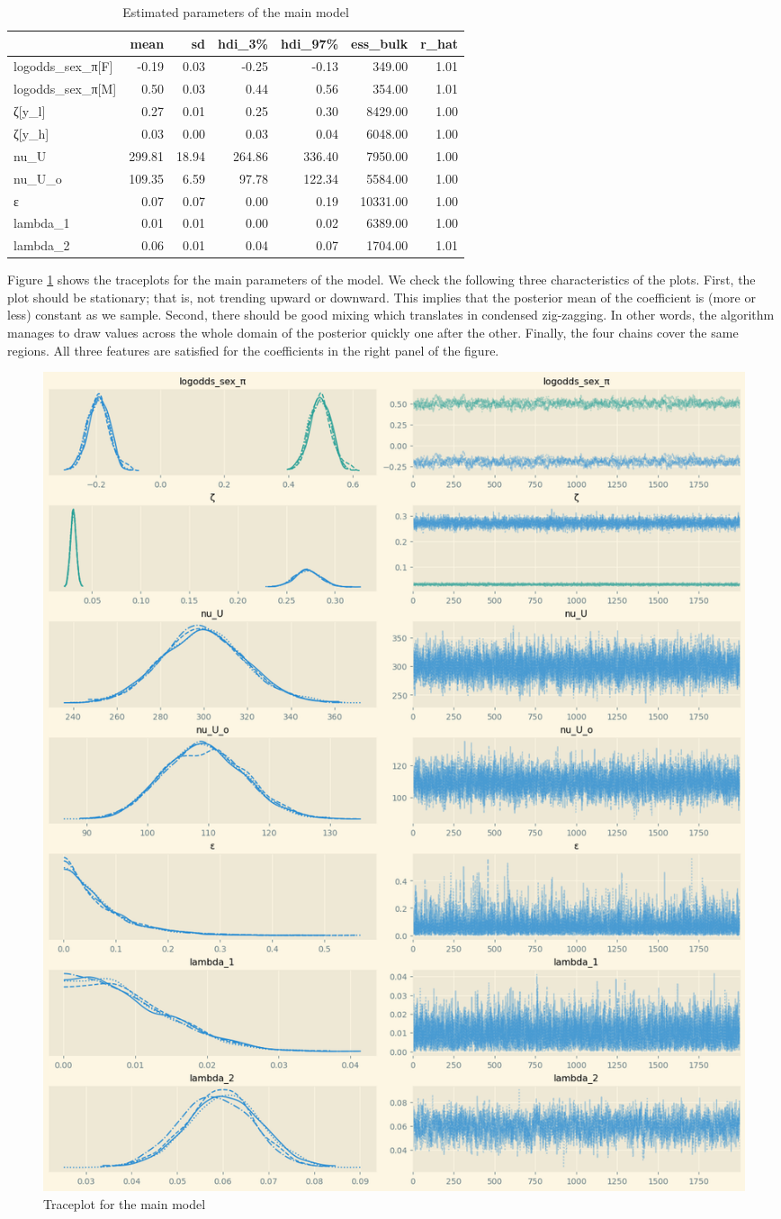 \documentclass[a4paper,12pt]{article}
\begin{document}
\begin{table}[htbp]
\caption{\label{tab:rhat_main}Estimated parameters of the main model}
\centering
\begin{tabular}{lrrrrrr}
 & mean & sd & hdi\_3\% & hdi\_97\% & ess\_bulk & r\_hat\\
\hline
logodds\_sex\_π{[}F] & -0.19 & 0.03 & -0.25 & -0.13 & 349.00 & 1.01\\
logodds\_sex\_π{[}M] & 0.50 & 0.03 & 0.44 & 0.56 & 354.00 & 1.01\\
ζ[y\_l] & 0.27 & 0.01 & 0.25 & 0.30 & 8429.00 & 1.00\\
ζ[y\_h] & 0.03 & 0.00 & 0.03 & 0.04 & 6048.00 & 1.00\\
nu\_U & 299.81 & 18.94 & 264.86 & 336.40 & 7950.00 & 1.00\\
nu\_U\_o & 109.35 & 6.59 & 97.78 & 122.34 & 5584.00 & 1.00\\
ε & 0.07 & 0.07 & 0.00 & 0.19 & 10331.00 & 1.00\\
lambda\_1 & 0.01 & 0.01 & 0.00 & 0.02 & 6389.00 & 1.00\\
lambda\_2 & 0.06 & 0.01 & 0.04 & 0.07 & 1704.00 & 1.01\\
\end{tabular}
\end{table}


Figure \ref{fig:tracemain} shows the traceplots for the main parameters of the model. We check the following three characteristics of the plots. First, the plot should be stationary; that is, not trending upward or downward. This implies that the posterior mean of the coefficient is (more or less) constant as we sample. Second, there should be good mixing which translates in condensed zig-zagging. In other words, the algorithm manages to draw values across the whole domain of the posterior quickly one after the other. Finally, the four chains cover the same regions. All three features are satisfied for the coefficients in the right panel of the figure.



\begin{figure}[htbp]
\centering
\includegraphics[width=.9\linewidth]{./figures/trace.png}
\caption{\label{fig:tracemain}Traceplot for the main model}
\end{figure}
\end{document}
